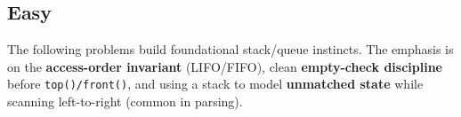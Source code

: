 \subsection{Easy}

The following problems build foundational stack/queue instincts.
The emphasis is on the \textbf{access-order invariant} (LIFO/FIFO), clean
\textbf{empty-check discipline} before \texttt{top()/front()}, and using a stack
to model \textbf{unmatched state} while scanning left-to-right (common in parsing).



% 
% 
% 
% 
